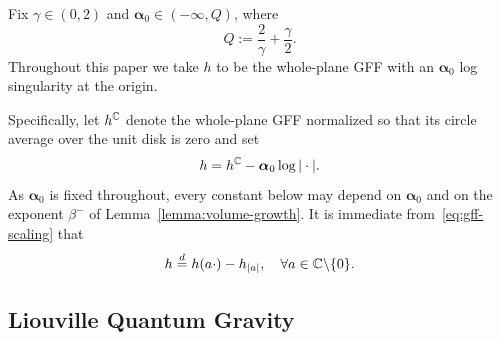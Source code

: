 \documentclass[12pt]{amsart}
\numberwithin{equation}{section}
\begin{document}
	
	Fix $\gamma \in (0,2)$ and $\boldsymbol{\alpha}_0 \in (-\infty, Q)$, where
	\begin{equation} \label{eq:Q}
	Q := \frac{2}{\gamma} + \frac{\gamma}{2}.
	\end{equation}
	Throughout this paper we take $h$ to be the whole-plane GFF with an $\boldsymbol{\alpha}_0$ log singularity at the origin.
	
	
	Specifically, let $h^{\mathbb{C}}$ denote the whole-plane GFF normalized so that its circle average over the unit disk is
	zero and set 
	\begin{equation} \label{eq:gff}
	h = h^{\mathbb{C}} - \boldsymbol{\alpha}_0 \log |\cdot|.
	\end{equation}
	As $\boldsymbol\alpha_0$ is fixed throughout, every constant below may depend on $\boldsymbol\alpha_0$ and on the exponent $\beta^-$ of Lemma~\ref{lemma:volume-growth}.
	It is immediate from~\eqref{eq:gff-scaling} that
	\begin{equation} \label{eq:h-coordinate-change}
	h \overset{d}{=} h(a\cdot) - h_{|a|}, \quad \forall a \in \mathbb{C} \backslash \{0\}.
	\end{equation}
	
	
	\subsection{Liouville Quantum Gravity} \label{subsec:lqg}
	
	
	
\end{document}
